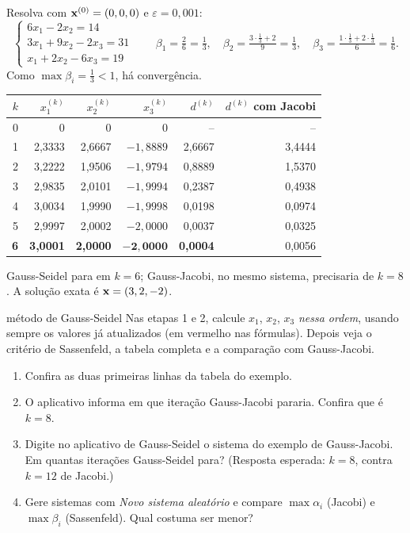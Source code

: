 \begin{exemplo}
Resolva com $\mathbf{x}^{(0)}=(0,0,0)$ e $\varepsilon=0{,}001$:
\[
\begin{cases}
6x_1-2x_2=14\\
3x_1+9x_2-2x_3=31\\
x_1+2x_2-6x_3=19
\end{cases}
\qquad
\beta_1=\tfrac26=\tfrac13,\quad
\beta_2=\tfrac{3\cdot\frac13+2}{9}=\tfrac13,\quad
\beta_3=\tfrac{1\cdot\frac13+2\cdot\frac13}{6}=\tfrac16.
\]
Como $\max\beta_i=\frac13<1$, há convergência.
\begin{center}
\begin{tabular}{rrrrr@{\qquad}r}
\toprule
$k$ & $x_1^{(k)}$ & $x_2^{(k)}$ & $x_3^{(k)}$ & $d^{(k)}$ & $d^{(k)}$ com Jacobi\\
\midrule
0 & 0 & 0 & 0 & -- & --\\
1 & 2{,}3333 & 2{,}6667 & $-1{,}8889$ & 2{,}6667 & 3{,}4444\\
2 & 3{,}2222 & 1{,}9506 & $-1{,}9794$ & 0{,}8889 & 1{,}5370\\
3 & 2{,}9835 & 2{,}0101 & $-1{,}9994$ & 0{,}2387 & 0{,}4938\\
4 & 3{,}0034 & 1{,}9990 & $-1{,}9998$ & 0{,}0198 & 0{,}0974\\
5 & 2{,}9997 & 2{,}0002 & $-2{,}0000$ & 0{,}0037 & 0{,}0325\\
\textbf{6} & \textbf{3{,}0001} & \textbf{2{,}0000} & $\mathbf{-2{,}0000}$ & \textbf{0{,}0004} & 0{,}0056\\
\bottomrule
\end{tabular}
\end{center}
Gauss-Seidel para em $k=6$; Gauss-Jacobi, no mesmo sistema, precisaria de $k=8$. A solução
exata é $\mathbf{x}=(3,2,-2)$.
\end{exemplo}

\begin{atividade}{método de Gauss-Seidel}{\arqSeidel}
Nas etapas 1 e 2, calcule $x_1$, $x_2$, $x_3$ \emph{nessa ordem}, usando sempre os valores já
atualizados (em vermelho nas fórmulas). Depois veja o critério de Sassenfeld, a tabela
completa e a comparação com Gauss-Jacobi.
\begin{enumerate}[nosep]
  \item Confira as duas primeiras linhas da tabela do exemplo.
  \item O aplicativo informa em que iteração Gauss-Jacobi pararia. Confira que é $k=8$.
  \item Digite no aplicativo de Gauss-Seidel o sistema do exemplo de Gauss-Jacobi. Em quantas
        iterações Gauss-Seidel para? (Resposta esperada: $k=8$, contra $k=12$ de Jacobi.)
  \item Gere sistemas com \emph{Novo sistema aleatório} e compare $\max\alpha_i$ (Jacobi) e
        $\max\beta_i$ (Sassenfeld). Qual costuma ser menor?
\end{enumerate}
\end{atividade}

